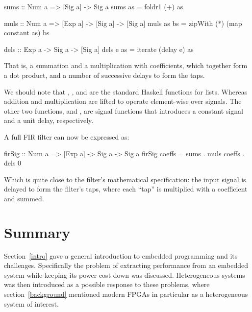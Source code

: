 \documentclass[../paper.tex]{subfiles}
\begin{document}
\begin{code}
sums :: Num a => [Sig a] -> Sig a
sums as = foldr1 (+) as

muls :: Num a => [Exp a] -> [Sig a] -> [Sig a]
muls as bs = zipWith (*) (map constant as) bs

dels :: Exp a -> Sig a -> [Sig a]
dels e as = iterate (delay e) as
\end{code}

\noindent That is, a summation and a multiplication with coefficients, which together form a dot product, and a number of successive delays to form the taps.

We should note that , ,  and  are the standard Haskell functions for lists. Whereas addition and multiplication are lifted to operate element-wise over signals. The other two functions,  and , are signal functions that introduces a constant signal and a unit delay, respectively.

A full FIR filter can now be expressed as:

\begin{code}
firSig :: Num a => [Exp a] -> Sig a -> Sig a
firSig coeffs = sums . muls coeffs . dels 0
\end{code}

\noindent Which is quite close to the filter's mathematical specification: the input signal is delayed to form the filter's taps, where each ``tap'' is multiplied with a coefficient and summed.



\section{Summary}

Section~\ref{intro} gave a general introduction to embedded programming and its challenges. Specifically the problem of extracting performance from an embedded system while keeping its power cost down was discussed. Heterogeneous systems was then introduced as a possible response to these problems, where section~\ref{background} mentioned modern FPGAs in particular as a heterogeneous system of interest.
\end{document}
